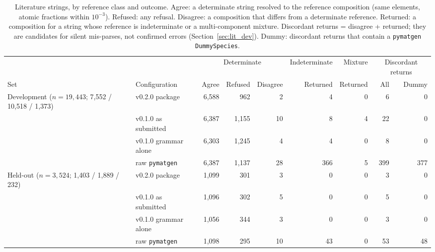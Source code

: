 \begin{table}[!t]
\centering
\caption{Literature strings, by reference class and outcome. Agree: a determinate string resolved to the reference composition (same elements, atomic fractions within $10^{-3}$). Refused: any refusal. Disagree: a composition that differs from a determinate reference. Returned: a composition for a string whose reference is indeterminate or a multi-component mixture. Discordant returns = disagree + returned; they are candidates for silent mis-parses, not confirmed errors (Section~\ref{sec:lit_dev}). Dummy: discordant returns that contain a \texttt{pymatgen} \texttt{DummySpecies}.}
\label{tab:literature}
\footnotesize
\setlength{\tabcolsep}{4pt}
\begin{tabular}{@{}llrrrrrrr@{}}
\toprule
 & & \multicolumn{3}{c}{Determinate} & Indeterminate & Mixture & \multicolumn{2}{c}{Discordant returns} \\
\cmidrule(lr){3-5}\cmidrule(lr){6-6}\cmidrule(lr){7-7}\cmidrule(l){8-9}
Set & Configuration & Agree & Refused & Disagree & Returned & Returned & All & Dummy \\
\midrule
Development ($n=19{,}443$; 7{,}552 / 10{,}518 / 1{,}373) & v0.2.0 package & 6{,}588 & 962 & 2 & 4 & 0 & 6 & 0 \\
 & v0.1.0 as submitted & 6{,}387 & 1{,}155 & 10 & 8 & 4 & 22 & 0 \\
 & v0.1.0 grammar alone & 6{,}303 & 1{,}245 & 4 & 4 & 0 & 8 & 0 \\
 & raw \texttt{pymatgen} & 6{,}387 & 1{,}137 & 28 & 366 & 5 & 399 & 377 \\
\midrule
Held-out ($n=3{,}524$; 1{,}403 / 1{,}889 / 232) & v0.2.0 package & 1{,}099 & 301 & 3 & 0 & 0 & 3 & 0 \\
 & v0.1.0 as submitted & 1{,}096 & 302 & 5 & 0 & 0 & 5 & 0 \\
 & v0.1.0 grammar alone & 1{,}056 & 344 & 3 & 0 & 0 & 3 & 0 \\
 & raw \texttt{pymatgen} & 1{,}098 & 295 & 10 & 43 & 0 & 53 & 48 \\
\bottomrule
\end{tabular}
\end{table}
